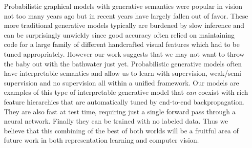\vspace{-2mm}
Probabilistic graphical models with generative semantics were popular in vision not too many years ago 
but in recent years have largely fallen out of favor. These more traditional generative models typically are burdened by slow inference and can be surprisingly unwieldy since good accuracy often relied on maintaining code for a large family of different handcrafted visual features which had to be tuned appropriately.  However our work suggests that we may not want to throw the baby out with the bathwater just yet.  
Probabilistic generative models often have interpretable  semantics  and allow us to learn with supervision, weak/semi-supervision and no supervision all within a unified framework.  Our models are examples of this type of interpretable generative model that \emph{can} coexist with rich feature hierarchies that are automatically tuned by end-to-end backpropagation. They are also fast at test time, requiring just a single forward pass through a neural network.  Finally they can be trained with no labeled data. Thus we believe that this combining of the best of both worlds will be a fruitful area of future work in both representation learning
and computer vision.

